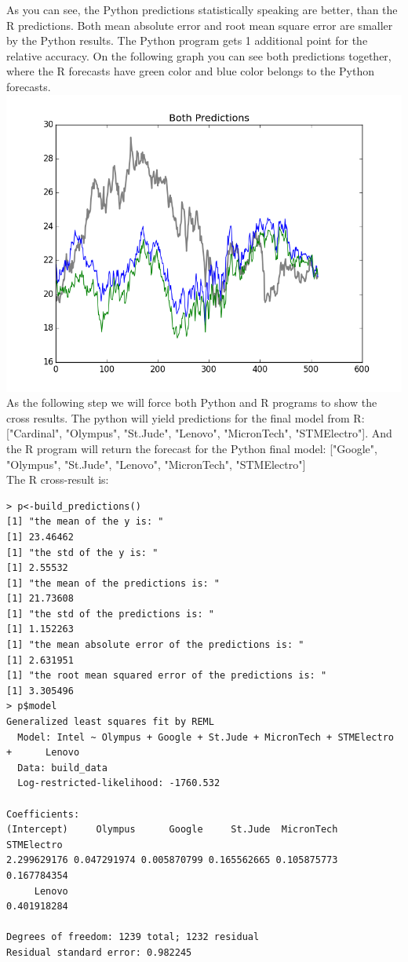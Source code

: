 \documentclass[
  twoside,
  12pt, a4paper,
  footinclude=true,
  headinclude=true,
  cleardoublepage=empty
]{article}
\begin{document}
As you can see, the Python predictions statistically speaking are better, than the R predictions. Both mean absolute error and root mean square error are smaller by the Python results. The Python program gets 1 additional point for the relative accuracy. On the following graph you can see both predictions together, where the R forecasts have green color and blue color belongs to the Python forecasts.\\
\includegraphics[scale=0.75]{BothPredictions.png}\\
As the following step we will force both Python and R programs to show the cross results. The python will yield predictions for the final model from R: ["Cardinal", "Olympus", "St.Jude", "Lenovo", "MicronTech", "STMElectro"]. And the R program will return the forecast for the Python final model: ["Google", "Olympus", "St.Jude", "Lenovo", "MicronTech", "STMElectro"]\\
The R cross-result is:
\begin{verbatim}
> p<-build_predictions()
[1] "the mean of the y is: "
[1] 23.46462
[1] "the std of the y is: "
[1] 2.55532
[1] "the mean of the predictions is: "
[1] 21.73608
[1] "the std of the predictions is: "
[1] 1.152263
[1] "the mean absolute error of the predictions is: "
[1] 2.631951
[1] "the root mean squared error of the predictions is: "
[1] 3.305496
> p$model
Generalized least squares fit by REML
  Model: Intel ~ Olympus + Google + St.Jude + MicronTech + STMElectro +      Lenovo 
  Data: build_data 
  Log-restricted-likelihood: -1760.532

Coefficients:
(Intercept)     Olympus      Google     St.Jude  MicronTech  STMElectro 
2.299629176 0.047291974 0.005870799 0.165562665 0.105875773 0.167784354 
     Lenovo 
0.401918284 

Degrees of freedom: 1239 total; 1232 residual
Residual standard error: 0.982245 
\end{verbatim}
\end{document}

